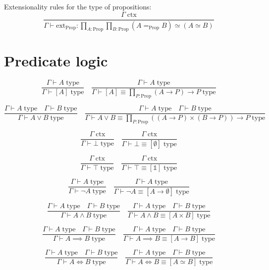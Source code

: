 \documentclass{book}
\begin{document}
Extensionality rules for the type of propositions:
$$\frac{\Gamma \; \mathrm{ctx}}{\Gamma \vdash \mathrm{ext}_{\mathrm{Prop}}:\prod_{A:\mathrm{Prop}} \prod_{B:\mathrm{Prop}} (A =_{\mathrm{Prop}} B) \simeq (A \simeq B)}$$

\section{Predicate logic}

$$\frac{\Gamma \vdash A \; \mathrm{type}}{\Gamma \vdash [A] \; \mathrm{type}} \quad \frac{\Gamma \vdash A \; \mathrm{type}}{\Gamma \vdash [A] \equiv \prod_{P:\mathrm{Prop}} (A \to P) \to P \; \mathrm{type}}$$

$$\frac{\Gamma \vdash A \; \mathrm{type} \quad \Gamma \vdash B \; \mathrm{type}}{\Gamma \vdash A \vee B \; \mathrm{type}} \quad \frac{\Gamma \vdash A \; \mathrm{type} \quad \Gamma \vdash B \; \mathrm{type}}{\Gamma \vdash A \vee B \equiv \prod_{P:\mathrm{Prop}} ((A \to P) \times (B \to P)) \to P \; \mathrm{type}}$$

$$\frac{\Gamma \; \mathrm{ctx}}{\Gamma \vdash \bot \; \mathrm{type}} \quad \frac{\Gamma \; \mathrm{ctx}}{\Gamma \vdash \bot \equiv [\emptyset] \; \mathrm{type}}$$

$$\frac{\Gamma \; \mathrm{ctx}}{\Gamma \vdash \top \; \mathrm{type}} \quad \frac{\Gamma \; \mathrm{ctx}}{\Gamma \vdash \top \equiv [\mathbb{1}] \; \mathrm{type}}$$

$$\frac{\Gamma \vdash A \; \mathrm{type}}{\Gamma \vdash \neg A \; \mathrm{type}} \quad \frac{\Gamma \vdash A \; \mathrm{type}}{\Gamma \vdash \neg A \equiv [A \to \emptyset] \; \mathrm{type}}$$

$$\frac{\Gamma \vdash A \; \mathrm{type} \quad \Gamma \vdash B \; \mathrm{type}}{\Gamma \vdash A \wedge B \; \mathrm{type}} \quad \frac{\Gamma \vdash A \; \mathrm{type} \quad \Gamma \vdash B \; \mathrm{type}}{\Gamma \vdash A \wedge B \equiv [A \times B] \; \mathrm{type}}$$

$$\frac{\Gamma \vdash A \; \mathrm{type} \quad \Gamma \vdash B \; \mathrm{type}}{\Gamma \vdash A \implies B \; \mathrm{type}} \quad \frac{\Gamma \vdash A \; \mathrm{type} \quad \Gamma \vdash B \; \mathrm{type}}{\Gamma \vdash A \implies B \equiv [A \to B] \; \mathrm{type}}$$

$$\frac{\Gamma \vdash A \; \mathrm{type} \quad \Gamma \vdash B \; \mathrm{type}}{\Gamma \vdash A \iff B \; \mathrm{type}} \quad \frac{\Gamma \vdash A \; \mathrm{type} \quad \Gamma \vdash B \; \mathrm{type}}{\Gamma \vdash A \iff B \equiv [A \simeq B] \; \mathrm{type}}$$
\end{document}
